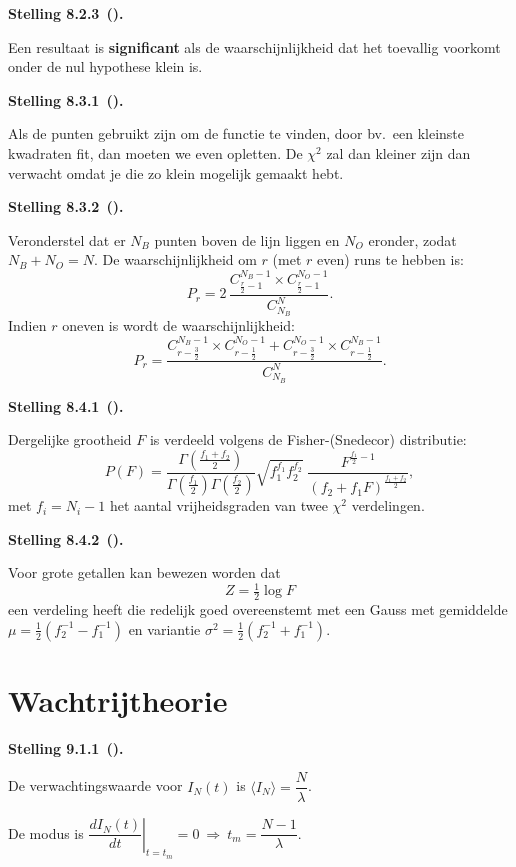 \documentclass[10pt,a4paper]{article}
\newenvironment{res}[3][]{%
  \begin{tcolorbox}[
    breakable,          %
    colback=gray!10,    %
    colframe=gray!40,   %
    boxrule=0.5pt,      %
    left=6pt, right=6pt, top=6pt, bottom=6pt %
  ]
  \noindent\textbf{#2 #3}\if\relax\detokenize{#1}\relax\else\ \textbf{(#1)}\fi\textbf{.}~\ignorespaces
}{%
  \end{tcolorbox}
}
\begin{document}
\begin{res}{Stelling}{8.2.3}
Een resultaat is \textbf{significant} als de waarschijnlijkheid dat het toevallig voorkomt onder de nul hypothese klein is.
\end{res}

\begin{res}{Stelling}{8.3.1}
Als de punten gebruikt zijn om de functie te vinden, door bv.\ een kleinste kwadraten fit, dan moeten we even opletten. De $\chi^2$ zal dan kleiner zijn dan verwacht omdat je die zo klein mogelijk gemaakt hebt.
\end{res}

\begin{res}{Stelling}{8.3.2}
Veronderstel dat er $N_B$ punten boven de lijn liggen en $N_O$ eronder, zodat $N_B+N_O=N$. De waarschijnlijkheid om $r$ (met $r$ even) runs te hebben is:
\[
P_r = 2\,\frac{C^{N_B-1}_{\frac r2-1}\times C^{N_O-1}_{\frac r2-1}}{C^N_{N_B}}.
\]
Indien $r$ oneven is wordt de waarschijnlijkheid:
\[
P_r = \frac{C^{N_B-1}_{r-\frac32}\times C^{N_O-1}_{r-\frac12} + C^{N_O-1}_{r-\frac32}\times C^{N_B-1}_{r-\frac12}}{C^N_{N_B}}.
\]
\end{res}

\begin{res}{Stelling}{8.4.1}
Dergelijke grootheid $F$ is verdeeld volgens de Fisher-(Snedecor) distributie:
\[
P(F) = \frac{\Gamma\!\left(\frac{f_1+f_2}{2}\right)}{\Gamma\!\left(\frac{f_1}{2}\right)\Gamma\!\left(\frac{f_2}{2}\right)}\sqrt{f_1^{f_1}f_2^{f_2}}\;\frac{F^{\frac{f_1}{2}-1}}{(f_2+f_1F)^{\frac{f_1+f_2}{2}}},
\]
met $f_i = N_i-1$ het aantal vrijheidsgraden van twee $\chi^2$ verdelingen.
\end{res}

\begin{res}{Stelling}{8.4.2}
Voor grote getallen kan bewezen worden dat
\[
Z = \tfrac12\log F
\]
een verdeling heeft die redelijk goed overeenstemt met een Gauss met gemiddelde $\mu = \tfrac12\left(f_2^{-1}-f_1^{-1}\right)$ en variantie $\sigma^2 = \tfrac12\left(f_2^{-1}+f_1^{-1}\right)$.
\end{res}

\section{Wachtrijtheorie}

\begin{res}{Stelling}{9.1.1}
De verwachtingswaarde voor $I_N(t)$ is $\langle I_N\rangle = \dfrac{N}{\lambda}$.

De modus is $\left.\dfrac{dI_N(t)}{dt}\right|_{t=t_m}=0 \ \Rightarrow\ t_m = \dfrac{N-1}{\lambda}$.
\end{res}
\end{document}
